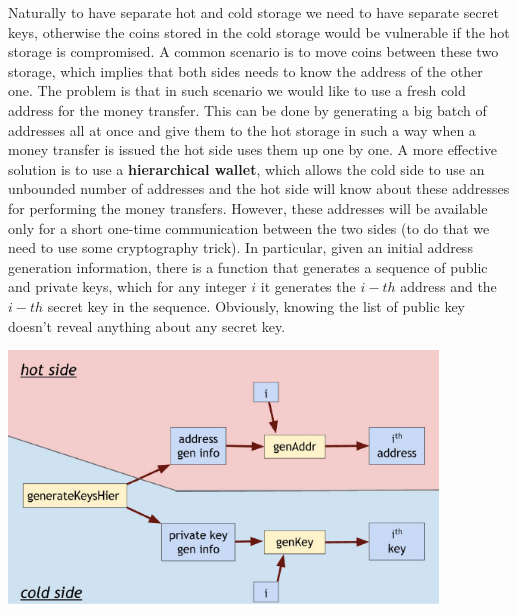 Naturally to have separate hot and cold storage we need to have separate secret keys, otherwise the coins stored in the cold storage would be vulnerable if the hot storage is compromised. A common scenario is to move coins between these two storage, which implies that both sides needs to know the address of the other one. The problem is that in such scenario we would like to use a fresh cold address for the money transfer. This can be done by generating a big batch of addresses all at once and give them to the hot storage in such a way when a money transfer is issued the hot side uses them up one by one. A more effective solution is to use a \textbf{hierarchical wallet}, which allows the cold side to use an unbounded number of addresses and the hot side will know about these addresses for performing the money transfers. However, these addresses will be available only for a short one-time communication between the two sides (to do that we need to use some cryptography trick). In particular, given an initial address generation information, there is a function that generates a sequence of public and private keys, which for any integer $i$ it generates the $i-th$ address and the $i-th$ secret key in the sequence. Obviously, knowing the list of public key doesn't reveal anything about 
any secret key.
\begin{center}
\includegraphics[scale=0.5]{./images/hierarchical_wallet_schema.png}
\end{center}

